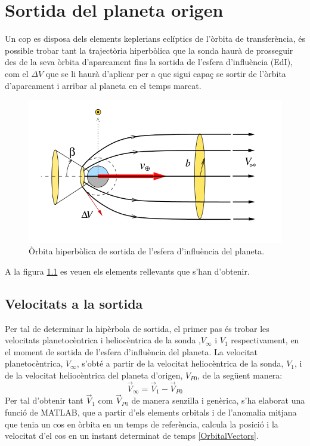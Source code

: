 \chapter{Sortida del planeta origen}
Un cop es disposa dels elements keplerians eclíptics de l'òrbita de transferència, és possible trobar tant la trajectòria hiperbòlica que la sonda haurà de prosseguir des de la seva òrbita d'aparcament fins la sortida de l'esfera d'influència (EdI), com el $\Delta V$ que se li haurà d'aplicar per a que sigui capaç se sortir de l'òrbita d'aparcament i arribar al planeta en el temps marcat.

\begin{figure}[H]
	\centering
	\includegraphics[scale=0.5]{./plots/hyperbola}
	\caption{Òrbita hiperbòlica de sortida de l'esfera d'influència del planeta.}
	\label{esquema_hyperbola}
\end{figure}
A la figura \ref{esquema_hyperbola} es veuen els elements rellevants que s'han d'obtenir.
\section{Velocitats a la sortida}
Per tal de determinar la hipèrbola de sortida, el primer pas és trobar les velocitats planetocèntrica i heliocèntrica de la sonda ,$V_{\infty}$ i $V_1$ respectivament, en el moment de sortida de l'esfera d'influència del planeta. La velocitat planetocèntrica, $V_{\infty}$, s'obté a partir de la velocitat heliocèntrica de la sonda, $V_1$, i de la velocitat heliocèntrica del planeta d'origen, $V_{P0}$, de la següent manera:
\begin{equation}
\vec{V}_{\infty} = \vec{V}_{1} - \vec{V}_{P0}
\end{equation}
Per tal d'obtenir tant $\vec{V}_{1}$ com $\vec{V}_{P0}$ de manera senzilla i genèrica, s'ha elaborat una funció de MATLAB, que a partir d'els elements orbitals i de l'anomalia mitjana que tenia un cos en òrbita en un temps de referència, calcula la posició i la velocitat d'el cos en un instant determinat de temps \ref{OrbitalVectors}.

